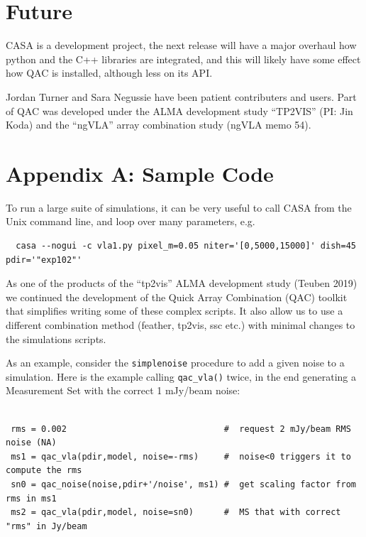 \documentclass[11pt,twoside]{article}
\begin{document}
\section{Future}

CASA is a development project, the next
release will have a major overhaul how python and the C++ libraries
are integrated, and this will likely have some effect how QAC is
installed, although less on its API. 

\acknowledgements Jordan Turner and Sara Negussie have been patient contributers and users.
Part of QAC was developed under the ALMA development study ``TP2VIS''  (PI: Jin Koda) and
the ``ngVLA'' array combination study (ngVLA memo 54).



\newpage
\section*{Appendix A: Sample Code}


To run a large suite of simulations, it can be very useful to call CASA from the Unix command line,
and loop over many parameters, e.g.

\footnotesize
\begin{verbatim}
  casa --nogui -c vla1.py pixel_m=0.05 niter='[0,5000,15000]' dish=45 pdir='"exp102"' 
\end{verbatim}
\normalsize

As one of the products of the ``tp2vis'' ALMA development study (Teuben 2019) we continued the development of the
Quick Array Combination (QAC) toolkit that simplifies writing some of these complex scripts. It also allow us
to use a different combination
method (feather, tp2vis, ssc etc.) with minimal changes to the simulations scripts.

As an example, consider the {\tt simplenoise} procedure to add a given noise to a simulation.
Here is the example calling {\tt qac\_vla()} twice, in the end generating a Measurement Set with
the correct 1 mJy/beam noise:

\footnotesize
\begin{verbatim}

 rms = 0.002                               #  request 2 mJy/beam RMS noise (NA)
 ms1 = qac_vla(pdir,model, noise=-rms)     #  noise<0 triggers it to compute the rms
 sn0 = qac_noise(noise,pdir+'/noise', ms1) #  get scaling factor from rms in ms1
 ms2 = qac_vla(pdir,model, noise=sn0)      #  MS that with correct "rms" in Jy/beam
\end{verbatim}
\normalsize
\end{document}
